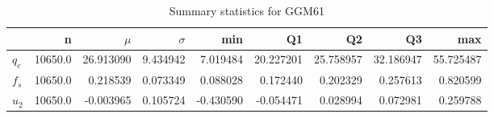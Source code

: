 \begin{table}[h]
\caption{Summary statistics for GGM61}
\begin{tabular}{lrrrrrrrr}
\toprule
{} &        n &      $\mu$ &  $\sigma$ &       min &         Q1 &         Q2 &         Q3 &        max \\
\midrule
$q_c$ &  10650.0 &  26.913090 &  9.434942 &  7.019484 &  20.227201 &  25.758957 &  32.186947 &  55.725487 \\
$f_s$ &  10650.0 &   0.218539 &  0.073349 &  0.088028 &   0.172440 &   0.202329 &   0.257613 &   0.820599 \\
$u_2$ &  10650.0 &  -0.003965 &  0.105724 & -0.430590 &  -0.054471 &   0.028994 &   0.072981 &   0.259788 \\
\bottomrule
\end{tabular}
\end{table}


